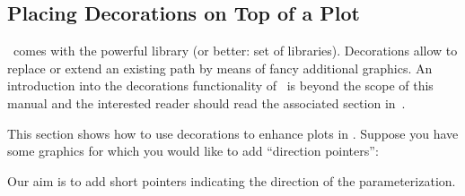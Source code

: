 \subsection{Placing Decorations on Top of a Plot}
{
%

\tikzname\ comes with the powerful  library (or better: set of libraries). Decorations allow to replace or extend an existing path by means of fancy additional graphics. An introduction into the decorations functionality of \tikzname\ is beyond the scope of this manual and the interested reader should read the associated section in~\cite{tikz}.

This section shows how to use decorations to enhance plots in \PGFPlots.
Suppose you have some graphics for which you would like to add ``direction pointers'':
\begin{codeexample}[]
\end{codeexample}
\noindent Our aim is to add short pointers indicating the direction of the parameterization. 

}

